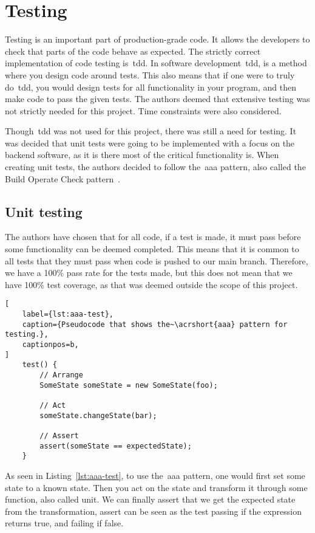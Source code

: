 \section{Testing}\label{sec:testing}

Testing is an important part of production-grade code.
It allows the developers to check that parts of the code behave as expected.
The strictly correct implementation of code testing is~\acrfull{tdd}.
In software development~\acrshort{tdd}, is a method where you design code around tests.
This also means that if one were to truly do~\acrshort{tdd}, you would design tests for all functionality
in your program, and then make code to pass the given tests.
The authors deemed that extensive testing was not strictly needed for this project.
Time constraints were also considered.

Though~\acrshort{tdd} was not used for this project, there was still a need for testing.
It was decided that unit tests were going to be implemented with a focus on the backend software, as
it is there most of the critical functionality is.
When creating unit tests, the authors decided to follow the~\acrfull{aaa} pattern, also called the Build Operate
Check pattern~\cite{clean-code}.

\subsection{Unit testing}\label{subsec:unit-tests}
The authors have chosen that for all code, if a test is made, it must pass before some functionality can be
deemed completed.
This means that it is common to all tests that they must pass when code is pushed to our main branch.
Therefore, we have a 100\% pass rate for the tests made, but this does not mean that we
have 100\% test coverage, as that was deemed outside the scope of this project.

\begin{lstlisting}[
    label={lst:aaa-test},
    caption={Pseudocode that shows the~\acrshort{aaa} pattern for testing.},
    captionpos=b,
]
    test() {
        // Arrange
        SomeState someState = new SomeState(foo);

        // Act
        someState.changeState(bar);

        // Assert
        assert(someState == expectedState);
    }
\end{lstlisting}

As seen in Listing~\ref{lst:aaa-test}, to use the~\acrshort{aaa} pattern,
one would first set some state to a known state.
Then you act on the state and transform it through some function, also called unit.
We can finally assert that we get the expected state from the transformation, assert can be seen
as the test passing if the expression returns true, and failing if false.

